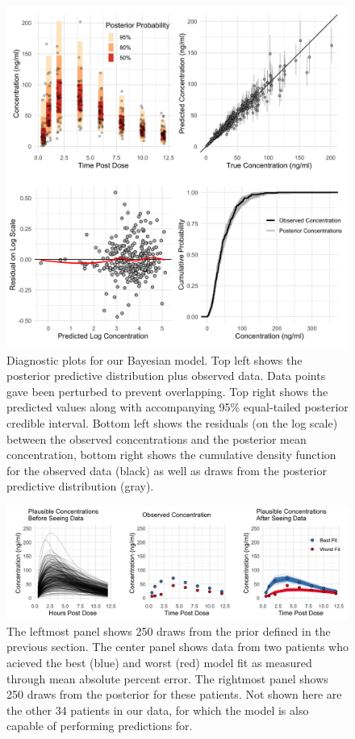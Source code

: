 \begin{figure}
	\centering
	\includegraphics[width=0.9\linewidth]{figs/diagnostics}
	\caption{Diagnostic plots for our Bayesian model.  Top left shows the posterior predictive distribution plus observed data.  Data points gave been perturbed to prevent overlapping. Top right shows the predicted values along with accompanying 95\% equal-tailed posterior credible interval. Bottom left shows the residuals (on the log scale) between the observed concentrations and the posterior mean concentration, bottom right shows the cumulative density function for the observed data (black) as well as draws from the posterior predictive distribution (gray).}
	\label{fig:fig3}
\end{figure}


\begin{figure}
	\centering
	\includegraphics[width=\linewidth]{figs/fig3}
	\caption{The leftmost panel shows 250 draws from the prior defined in the previous section.  The center panel shows data from two patients who acieved the best (blue) and worst (red) model fit as measured through mean absolute percent error.  The rightmost panel shows 250 draws from the posterior for these patients.  Not shown here are the other 34 patients in our data, for which the model is also capable of performing predictions for. }
	\label{fig:fig4}
\end{figure}

